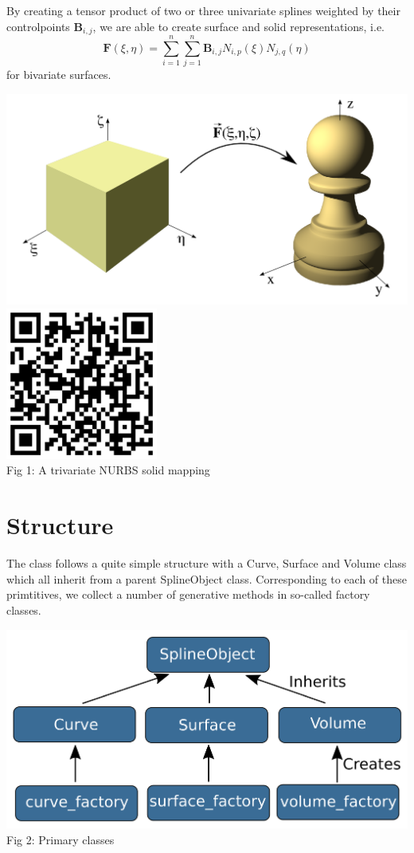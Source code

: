 \documentclass[landscape]{sintefposter}
\begin{document}
\begin{multicols}{3}
By creating a tensor product of two or three univariate splines weighted by their controlpoints $\mathbf{B}_{i,j}$, we are able to create surface and solid representations, i.e.
\begin{equation}
  \mathbf{F}(\xi,\eta) = \sum_{i=1}^n \sum_{j=1}^n \mathbf{B}_{i,j} N_{i,p}(\xi)N_{j,q}(\eta)
\end{equation}
for bivariate surfaces.

\begin{center}
  \includegraphics[width=16cm]{pawn-mapping}
  \includegraphics[height=5cm]{MappingQR} \\
  \normalsize{Fig 1: A trivariate NURBS solid mapping}
\end{center}

\section{Structure}

The class follows a quite simple structure with a Curve, Surface and Volume class which all inherit from a parent SplineObject class. Corresponding to each of these primtitives, we collect a number of generative methods in so-called factory classes.

\begin{center}
  \includegraphics[width=0.7\linewidth]{classstructure} \\
  \normalsize{Fig 2: Primary classes}
\end{center}


\end{multicols}
\end{document}
